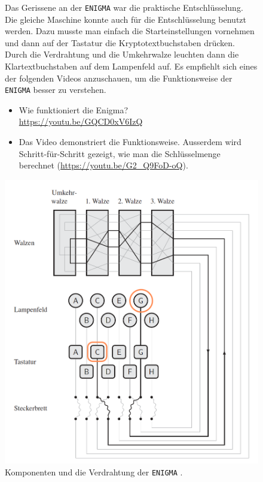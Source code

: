 \begin{figure}[htb]
	\centering
	\begin{minipage}{0.55\textwidth}
	Das Gerissene an der \texttt{ENIGMA} war die praktische Entschlüsselung. Die gleiche Maschine konnte auch für die Entschlüsselung benutzt werden. Dazu musste man einfach die Starteinstellungen vornehmen und dann auf der Tastatur die Kryptotextbuchstaben drücken. Durch die Verdrahtung und die Umkehrwalze leuchten dann die Klartextbuchstaben auf dem Lampenfeld auf. Es empfiehlt sich eines der folgenden Videos anzuschauen, um die Funktionsweise der \texttt{ENIGMA} besser zu verstehen.
	\begin{itemize}
	\item Wie funktioniert die Enigma? \\ \url{https://youtu.be/GQCD0xV6IzQ}
	\item Das Video  demonstriert die Funktionsweise. Ausserdem wird Schritt-für-Schritt gezeigt, wie man die Schlüsselmenge berechnet (\url{https://youtu.be/G2_Q9FoD-oQ}).
\end{itemize}
	\end{minipage}
	\hfill
	\begin{minipage}{0.425\textwidth}
	\centering
	\includegraphics[scale=0.3]{enigma_funktionsweise_vereinfacht.png}
	\caption{Komponenten und die Verdrahtung der \texttt{ENIGMA} \cite{freiermuth2014kryptologie}.}
	\label{figure-enigma-aufbau}
	\end{minipage}
\end{figure}

